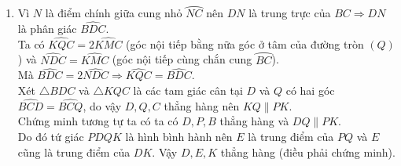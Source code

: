 \begin{bt}
{\begin{enumerate}
			Vậy tứ giác $BHIK$ là hình thoi (dấu hiệu nhận biết hình thoi). 
			\item Vì $N$ là điểm chính giữa cung nhỏ $\wideparen{NC}$ nên $DN$ là trung trực của $BC \Rightarrow DN$ là phân giác $\widehat{BDC}.$ \\
			Ta có $\widehat{KQC}=2\widehat{KMC}$ (góc nội tiếp bằng nữa góc ở tâm  của đường tròn $(Q)$) và $\widehat{NDC}=\widehat{KMC}$ (góc nội tiếp cùng chắn cung $\wideparen{BC}$).\\
			Mà $\widehat{BDC}=2\widehat{NDC} \Rightarrow \widehat{KQC}=\widehat{BDC}$.\\
			Xét $\triangle BDC$ và $\triangle KQC $
			là các tam giác cân tại $D$ và $Q$ có hai góc $\widehat{BCD}=\widehat{BCQ}$, do vậy $D,Q,C$ thẳng hàng nên $KQ \parallel PK$.\\					
			Chứng minh tương tự ta có ta có $D,P,B$ thẳng hàng và $ DQ\parallel PK$.\\		
			Do đó tứ giác $PDQK$ là hình bình hành nên $E$ là trung điểm của $PQ$ và $E$ cũng là trung điểm của $DK$. Vậy $D,E,K$ thẳng hàng (điều phải chứng minh).
		\end{enumerate}
	}
\end{bt}


